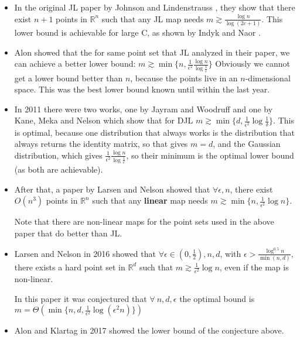 \documentclass[11pt]{article}
\newcommand{\R}{\mathbb{R}}
\begin{document}
\begin{itemize}
  \item In the original JL paper by Johnson and Lindenstrauss \cite{JL84}, they show that there exist $n+1$ points in $\R^n$ such that any JL map needs $m\gtrsim\frac{\log n}{\log(2c+1)}$. This lower bound is achievable for large C, as shown by Indyk and Naor \cite{IN07}.%

  \item Alon \cite{ALON03} showed that the for same point set that JL analyzed in their paper, we can achieve a better lower bound: $m\gtrsim \min\{n, \frac{1}{\epsilon^2}\frac{\log n}{\log \frac{1}{\epsilon}}\}$ Obviously we cannot get a lower bound better than $n$, because the points live in an $n$-dimensional space. This was the best lower bound known until within the last year.

  \item In 2011 there were two works, one by Jayram and Woodruff \cite{JW11} and one by Kane, Meka and Nelson \cite{KMN11} which show that for DJL $m\gtrsim\min\{d, \frac{1}{\epsilon^2}\log \frac{1}{\delta}\}$. This is optimal, because one distribution that always works is the distribution that always returns the identity matrix, so that gives $m=d$, and the Gaussian distribution, which gives $\frac{1}{\epsilon^2}\frac{\log n}{\log\frac{1}{\epsilon}}$, so their minimum is the optimal lower bound (as both are achievable).

  \item After that, a paper by Larsen and Nelson \cite{LN14} showed that $\forall \epsilon, n$, there exist $O(n^3)$ points in $\R^n$ such that any \textbf{linear} map needs $m\gtrsim \min\{n, \frac{1}{\epsilon^2} \log n\}$.

    Note that there are non-linear maps for the point sets used in the above paper that do better than JL.

  \item Larsen and Nelson in 2016 \cite{LN16} showed that $\forall \epsilon \in (0, \frac{1}{2}), n, d$, with $\epsilon>\frac{\log^{0.5}n}{\min(n, d)}$, there exists a hard point set in $\R^d$ such that $m\gtrsim \frac{1}{\epsilon^2}\log n$, even if the map is non-linear.

    In this paper it was conjectured that  $\forall\ n, d, \epsilon$ the optimal bound is $m=\Theta(\min\{n, d, \frac{1}{\epsilon^2}\log(\epsilon^2n)\})$

  \item Alon and Klartag in 2017 \cite{AK17} showed the lower bound of the conjecture above.
\end{itemize}
\end{document}

